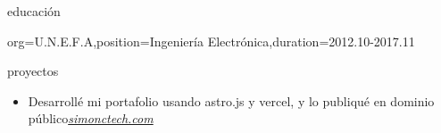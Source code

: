 \documentclass{resume}
\begin{document}
\begin{ResumeSection}{educación}
    \begin{ResumeSubsection}{org={U.N.E.F.A},position={Ingeniería Electrónica},duration={2012.10-2017.11}}
    \end{ResumeSubsection}
\end{ResumeSection}

\begin{ResumeSection}{proyectos}
        \begin{itemize}
        \item Desarrollé mi portafolio usando astro.js y vercel, y lo publiqué en dominio público\hfill\em{{\href{https://www.simonctech.com}{simonctech.com}}}
    \end{itemize}
\end{ResumeSection}
\end{document}

